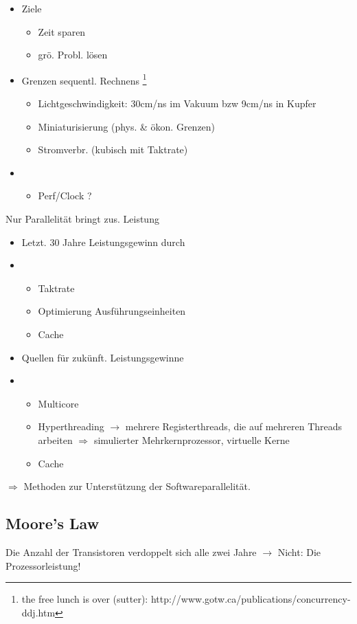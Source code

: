 \begin{itemize}
	\item  Ziele
		\begin{itemize}
			\item Zeit sparen
			\item grö. Probl. lösen
		\end{itemize}
	\item  Grenzen sequentl. Rechnens \footnote{the free lunch is over (sutter):
		http://www.gotw.ca/publications/concurrency-ddj.htm}
		\begin{itemize}
			\item Lichtgeschwindigkeit: 30cm/ns im Vakuum bzw 9cm/ns in Kupfer
			\item Miniaturisierung (phys. \& ökon. Grenzen)
			\item Stromverbr. (kubisch mit Taktrate)
		\end{itemize}
	\item 
		\begin{itemize}
			\item Perf/Clock ?
		\end{itemize}
\end{itemize}

Nur Parallelität bringt zus. Leistung
\begin{itemize}
	\item  Letzt. 30 Jahre Leistungsgewinn durch
	\item 
		\begin{itemize}
			\item Taktrate
			\item Optimierung Ausführungseinheiten
			\item Cache
		\end{itemize}
	\item  Quellen für zukünft. Leistungsgewinne
	\item 
		\begin{itemize}
			\item Multicore
			\item Hyperthreading $\rightarrow$ mehrere Registerthreads, die auf mehreren Threads arbeiten $\Rightarrow$ simulierter Mehrkernprozessor, virtuelle Kerne
			\item Cache
		\end{itemize}
\end{itemize}

$\Rightarrow$ Methoden zur Unterstützung der Softwareparallelität.

\subsection{Moore's Law}
Die Anzahl der Transistoren verdoppelt sich alle zwei Jahre
$\rightarrow$ Nicht: Die Prozessorleistung!

